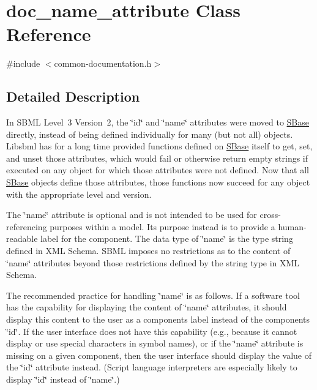\hypertarget{classdoc__name__attribute}{}\section{doc\+\_\+name\+\_\+attribute Class Reference}
\label{classdoc__name__attribute}


{\ttfamily \#include $<$common-\/documentation.\+h$>$}



\subsection{Detailed Description}
\begin{DoxyParagraph}{}
In S\+B\+ML Level~3 Version~2, the \char`\"{}id\char`\"{} and \char`\"{}name\char`\"{} attributes were moved to \hyperlink{class_s_base}{S\+Base} directly, instead of being defined individually for many (but not all) objects. Libsbml has for a long time provided functions defined on \hyperlink{class_s_base}{S\+Base} itself to get, set, and unset those attributes, which would fail or otherwise return empty strings if executed on any object for which those attributes were not defined. Now that all \hyperlink{class_s_base}{S\+Base} objects define those attributes, those functions now succeed for any object with the appropriate level and version.
\end{DoxyParagraph}
The \char`\"{}name\char`\"{} attribute is optional and is not intended to be used for cross-\/referencing purposes within a model. Its purpose instead is to provide a human-\/readable label for the component. The data type of \char`\"{}name\char`\"{} is the type {\ttfamily string} defined in X\+ML Schema. S\+B\+ML imposes no restrictions as to the content of \char`\"{}name\char`\"{} attributes beyond those restrictions defined by the {\ttfamily string} type in X\+ML Schema.

The recommended practice for handling \char`\"{}name\char`\"{} is as follows. If a software tool has the capability for displaying the content of \char`\"{}name\char`\"{} attributes, it should display this content to the user as a component\textquotesingle{}s label instead of the component\textquotesingle{}s \char`\"{}id\char`\"{}. If the user interface does not have this capability (e.\+g., because it cannot display or use special characters in symbol names), or if the \char`\"{}name\char`\"{} attribute is missing on a given component, then the user interface should display the value of the \char`\"{}id\char`\"{} attribute instead. (Script language interpreters are especially likely to display \char`\"{}id\char`\"{} instead of \char`\"{}name\char`\"{}.)

